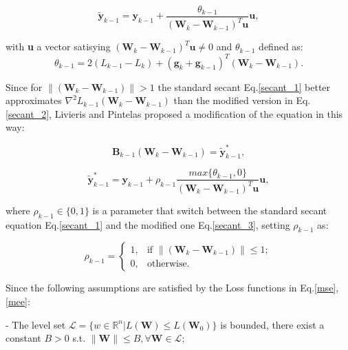 			\begin{equation}
			\label{secant_2}
 			 \widetilde{\textbf{y}}_{k-1} =  \textbf{y}_{k-1} + \frac{\theta_{k-1}}{(\textbf{W}_k - \textbf{W}_{k-1})^T\textbf{u}}\textbf{u},
 			\end{equation}

 			with \textbf{u} a vector satisying $(\textbf{W}_k - \textbf{W}_{k-1})^T\textbf{u} \neq 0$ and $\theta_{k-1}$ defined as:
 			\begin{equation}
			\label{theta}
 			 \theta_{k-1} = 2(\textit{L}_{k-1} - \textit{L}_{k}) + (\textbf{g}_k + \textbf{g}_{k-1})^T(\textbf{W}_k - \textbf{W}_{k-1}).
 			\end{equation}


 			Since for $\|(\textbf{W}_k - \textbf{W}_{k-1})\| > 1$ the standard secant Eq.\ref{secant_1} better approximates $\nabla^2\textit{L}_{k-1}(\textbf{W}_k - \textbf{W}_{k-1})$ than the modified version in Eq.\ref{secant_2}, Livieris and Pintelas\cite{LIVIERIS2013491} proposed a modification of the equation in this way:

 			\begin{equation}
			\label{secant_3}
 				\textbf{B}_{k-1} (\textbf{W}_k - \textbf{W}_{k-1}) = \widetilde{\textbf{y}}_{k-1}^*,
 			\end{equation}

 			\begin{equation}
			\label{y_3}
 				\widetilde{\textbf{y}}_{k-1}^* = \textbf{y}_{k-1} + \rho_{k-1} \frac{max\{\theta_{k-1},0\}}{(\textbf{W}_k - \textbf{W}_{k-1})^T\textbf{u}}\textbf{u},
 			\end{equation}

 			where $\rho_{k-1} \in \{0,1\}$ is a parameter that switch between the standard secant equation Eq.\ref{secant_1} and the modified one Eq.\ref{secant_3}, setting $\rho_{k-1}$ as:

			\begin{equation}
			\label{rho}
			  \rho_{k-1} =\begin{cases}
			    1 , & \text{if }\|(\textbf{W}_k - \textbf{W}_{k-1})\| \leq 1;\\
			    0 , & \text{otherwise.}
			  \end{cases}
			\end{equation}

			Since the following assumptions are satisfied by the Loss functions in Eq.\ref{mse}, \ref{mee}:

			\begin{asu} - \label{as:1}
  				The level set $\mathcal{L} = \{w \in \mathbb{R}^n | \textit{L}(\textbf{W}) \leq L(\textbf{W}_0)\}$ is bounded, there exist a constant $B > 0$ s.t. $\|\textbf{W}\| \leq B, \forall \textbf{W} \in \mathcal{L}$;
			\end{asu}

